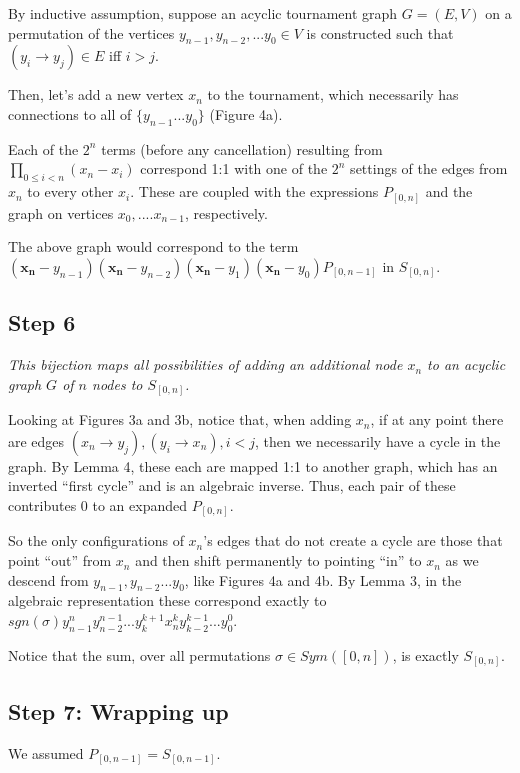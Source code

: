 \documentclass[11pt, oneside]{article} 	%
\begin{document}
By inductive assumption, suppose an acyclic tournament graph $G = (E, V)$ on a permutation of the vertices $y_{n-1}, y_{n-2}, ... y_0 \in V$ is constructed such that $(y_i \rightarrow y_j) \in E$ iff $i > j$.

Then, let's add a new vertex $x_n$ to the tournament, which necessarily has connections to all of $\{y_{n-1}...y_0\}$ (Figure 4a).


Each of the $2^n$ terms (before any cancellation) resulting from $\prod_{0 \leq i < n}(x_n-x_i)$ correspond 1:1 with one of the $2^n$ settings of the edges from $x_n$ to every other $x_i$.  These are coupled with the expressions $P_{[0,n]}$ and the graph on vertices $x_0, .... x_{n-1}$, respectively.

The above graph would correspond to the term $(\mathbf{x_n}-y_{n-1})(\mathbf{x_n}-y_{n-2})(\mathbf{x_n}-y_{1})(\mathbf{x_n}-y_{0})P_{[0,n-1]}$ in $S_{[0,n]}$.


\subsection{Step 6}

\emph{This bijection maps all possibilities of adding an additional node $x_n$ to an acyclic graph $G$ of $n$ nodes to $S_{[0,n]}$.}

Looking at Figures 3a and 3b, notice that, when adding $x_n$, if at any point there are edges $(x_n \rightarrow y_{j}), (y_{i} \rightarrow x_n), i < j$, then we necessarily have a cycle in the graph.  By Lemma 4, these each are mapped 1:1 to another graph, which has an inverted ``first cycle'' and is an algebraic inverse.  Thus, each pair of these contributes $0$ to an expanded $P_{[0,n]}$.

So the only configurations of $x_n$'s edges that do not create a cycle are those that point ``out'' from $x_n$ and then shift permanently to pointing ``in'' to $x_n$ as we descend from $y_{n-1}, y_{n-2} ... y_0$, like Figures 4a and 4b. By Lemma 3, in the algebraic representation these correspond exactly to $sgn(\sigma) y_{n-1}^{n}y_{n-2}^{n-1}...y_{k}^{k+1}x_n^ky_{k-2}^{k-1}...y_0^0$. 

Notice that the sum, over all permutations $\sigma \in Sym([0,n])$, is exactly $S_{[0,n]}$. 


\subsection{Step 7: Wrapping up}

We assumed $P_{[0, n-1]} = S_{[0, n-1]}$.
\end{document}
